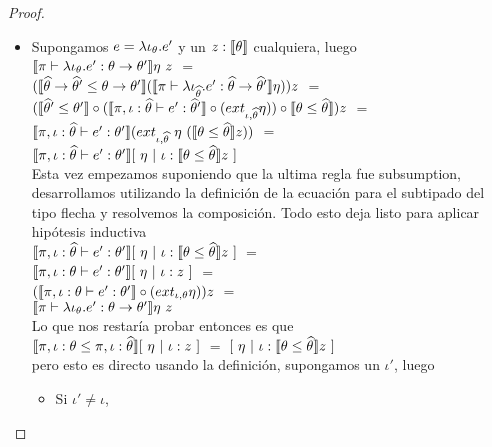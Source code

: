 \begin{proof}
\begin{itemize}
\begin{itemize}
\item Supongamos $e = \lambda \iota_{\theta} . e'$ y un $z : \llbracket \theta \rrbracket$ cualquiera, luego\\

$\semBrcks{\pi \vdash \clambda{\iota}{\theta}{e'} : \theta \rightarrow \theta'}\eta \ z$ $=$\\
$(\llbracket \widehat{\theta} \rightarrow \widehat{\theta}' \leq \theta \rightarrow \theta' \rrbracket
(\llbracket \pi \vdash \lambda \iota_{\widehat{\theta}} . e' : \widehat{\theta} \rightarrow \widehat{\theta}' \rrbracket\eta))z$
$=$\\
$(\llbracket \widehat{\theta}' \leq \theta' \rrbracket 
	\circ
(\llbracket \pi,\iota:\widehat{\theta} \vdash e' : \widehat{\theta}' \rrbracket \circ (ext_{\iota,\widehat{\theta}}\eta))
	\circ
\llbracket \theta \leq \widehat{\theta} \rrbracket) z$ $=$\\
$\llbracket \pi,\iota:\widehat{\theta} \vdash e' : \theta' \rrbracket
		(ext_{\iota,\widehat{\theta}} \ \eta \ (\llbracket \theta \leq \widehat{\theta} \rrbracket z))$ $=$\\
$\semBrcks{\pi,\iota:\thetahat \vdash e' : \theta'}
		[ \ \eta \ | \ \iota:\semBrcks{\theta \leq \thetahat}z \ ]$\\

Esta vez empezamos suponiendo que la ultima regla fue subsumption, desarrollamos
utilizando la definici\'on de la ecuaci\'on para el subtipado del tipo flecha y
resolvemos la composici\'on. Todo esto deja listo para aplicar hip\'otesis inductiva\\

$\semBrcks{\pi,\iota:\thetahat \vdash e' : \theta'}
		[ \ \eta \ | \ \iota:\semBrcks{\theta \leq \thetahat}z \ ]$ $=$\\
$\llbracket \pi,\iota:\theta \vdash e' : \theta' \rrbracket [ \ \eta \ | \ \iota:z \ ]$ $=$\\
$(\llbracket \pi,\iota:\theta \vdash e' : \theta' \rrbracket \circ (ext_{\iota,\theta} \eta)) z$ $=$\\
$\semBrcks{\pi \vdash \clambda{\iota}{\theta}{e'} : \theta \rightarrow \theta'}\eta \ z$\\

Lo que nos restar\'ia probar entonces es que\\

$\llbracket \pi,\iota:\theta \leq \pi,\iota:\widehat{\theta} \rrbracket[ \ \eta \ | \ \iota:z \ ]$ $=$
$[ \ \eta \ | \ \iota:\llbracket \theta \leq \widehat{\theta} \rrbracket z \ ]$\\

pero esto es directo usando la definici\'on, supongamos un $\iota'$, luego

\begin{itemize}
\item Si $\iota' \neq \iota$, \\


\end{itemize}
\end{itemize}
\end{itemize}
\end{proof}
